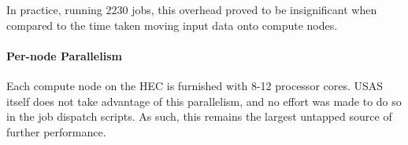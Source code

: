 In practice, running 2230 jobs, this overhead proved to be insignificant when compared to the time taken moving input data onto compute nodes.






\paragraph{Per-node Parallelism}
Each compute node on the HEC is furnished with 8-12 processor cores.  USAS itself does not take advantage of this parallelism, and no effort was made to do so in the job dispatch scripts.  As such, this remains the largest untapped source of further performance.





